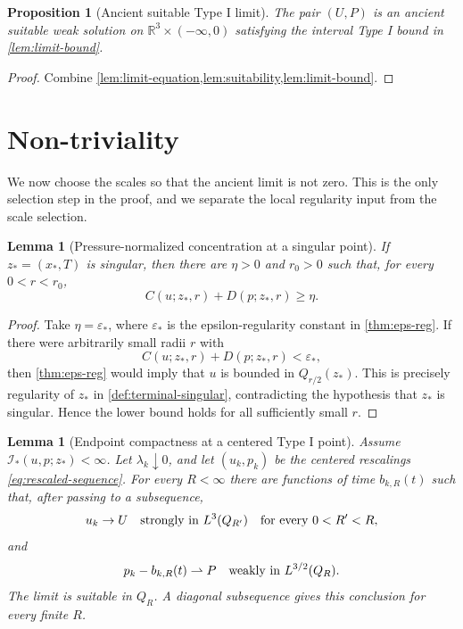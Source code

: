 \documentclass[11pt]{amsart}
\theoremstyle{plain}
\newtheorem{proposition}[theorem]{Proposition}
\newtheorem{lemma}[theorem]{Lemma}
\theoremstyle{definition}
\theoremstyle{remark}
\numberwithin{equation}{section}
\newcommand{\R}{\mathbb R}
\newcommand{\eps}{\varepsilon}
\newcommand{\calI}{\mathcal I}
\begin{document}
\begin{proposition}[Ancient suitable Type I limit]\label{prop:ancient-limit}
The pair \((U,P)\) is an ancient suitable weak solution on
\(\R^3\times(-\infty,0)\) satisfying the interval Type I bound in
\cref{lem:limit-bound}.
\end{proposition}

\begin{proof}
Combine \cref{lem:limit-equation,lem:suitability,lem:limit-bound}.
\end{proof}

\section{Non-triviality}\label{sec:nontrivial}

We now choose the scales so that the ancient limit is not zero.  This is the
only selection step in the proof, and we separate the local regularity input
from the scale selection.

\begin{lemma}[Pressure-normalized concentration at a singular point]
\label{lem:singular-concentration}
If \(z_*=(x_*,T)\) is singular, then there are \(\eta>0\) and \(r_0>0\) such
that, for every \(0<r<r_0\),
\begin{equation}\label{eq:positive-concentration-sequence}
   C(u;z_*,r)+D(p;z_*,r)\ge \eta .
\end{equation}
\end{lemma}

\begin{proof}
Take \(\eta=\eps_*\), where \(\eps_*\) is the epsilon-regularity constant in
\cref{thm:eps-reg}.  If there were arbitrarily small radii \(r\) with
\[
   C(u;z_*,r)+D(p;z_*,r)<\eps_*,
\]
then \cref{thm:eps-reg} would imply that \(u\) is bounded in
\(Q_{r/2}(z_*)\).  This is precisely regularity of \(z_*\) in
\cref{def:terminal-singular}, contradicting the hypothesis that \(z_*\) is
singular.  Hence the lower bound holds for all sufficiently small \(r\).
\end{proof}

\begin{lemma}[Endpoint compactness at a centered Type I point]
\label{lem:endpoint-compactness}
Assume \(\calI_*(u,p;z_*)<\infty\).  Let \(\lambda_k\downarrow0\), and let
\((u_k,p_k)\) be the centered rescalings \eqref{eq:rescaled-sequence}.  For
every \(R<\infty\) there are functions of time \(b_{k,R}(t)\) such that,
after passing to a subsequence,
\[
   u_k\to U
   \quad\hbox{strongly in }L^3(Q_{R'})
   \quad\hbox{for every }0<R'<R,
 \]
and
\[
   p_k-b_{k,R}(t)\rightharpoonup P
   \quad\hbox{weakly in }L^{3/2}(Q_R).
 \]
The limit is suitable in \(Q_R\).  A diagonal subsequence gives this conclusion
for every finite \(R\).
\end{lemma}
\end{document}
